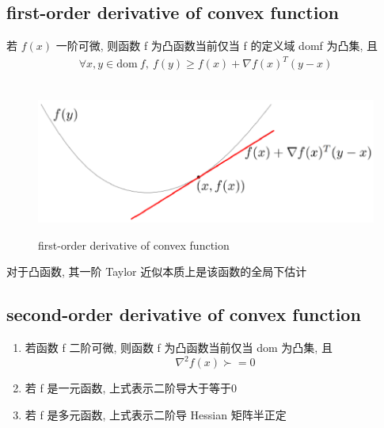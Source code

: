 \documentclass[oneside, 12pt]{ctexbook}
\begin{document}
			\subsection{\quad first-order derivative of convex function}
				若 $f(x)$ 一阶可微, 则函数 f 为凸函数当前仅当 f 的定义域 domf 为凸集, 且
				\begin{align}
					\forall x, y \in \text{dom} \ f, \ f(y) \geq f(x) + \nabla f(x)^T (y-x)
				\end{align}
				\begin{figure}[H]
					\vspace{-0.6cm}  %
					\setlength{\abovecaptionskip}{-0.2cm}   %
					\centering
					\includegraphics[scale=0.6]{first_derivation_of_convex_function.png}
					\renewcommand{\figurename}{Fig} %
					\caption{first-order derivative of convex function}
					\label{fig:8}
				\end{figure}
				
				对于凸函数, 其一阶 Taylor 近似本质上是该函数的全局下估计
				
			\subsection{\quad second-order derivative of convex function}
				\begin{enumerate}
					\item 若函数 f 二阶可微, 则函数 f 为凸函数当前仅当 dom 为凸集, 且
						\begin{equation}
							\nabla^2 f(x) \succ = 0
						\end{equation}
						
					\item 若 f 是一元函数, 上式表示二阶导大于等于0
					
					\item 若 f 是多元函数, 上式表示二阶导 Hessian 矩阵半正定
				\end{enumerate}
\end{document}

